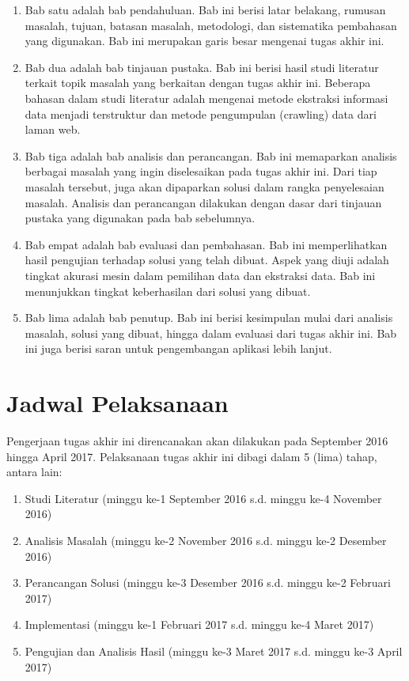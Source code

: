 \begin{enumerate}
    \item Bab satu adalah bab pendahuluan. Bab ini berisi latar belakang, rumusan masalah, tujuan, batasan masalah, metodologi, dan sistematika pembahasan yang digunakan. Bab ini merupakan garis besar mengenai tugas akhir ini.
    \item Bab dua adalah bab tinjauan pustaka. Bab ini berisi hasil studi literatur terkait topik masalah yang berkaitan dengan tugas akhir ini. Beberapa bahasan dalam studi literatur adalah mengenai metode ekstraksi informasi data menjadi terstruktur dan metode pengumpulan (crawling) data dari laman web.
    \item Bab tiga adalah bab analisis dan perancangan. Bab ini memaparkan analisis berbagai masalah yang ingin diselesaikan pada tugas akhir ini. Dari tiap masalah tersebut, juga akan dipaparkan solusi dalam rangka penyelesaian masalah. Analisis dan perancangan dilakukan dengan dasar dari tinjauan pustaka yang digunakan pada bab sebelumnya.
    \item Bab empat adalah bab evaluasi dan pembahasan. Bab ini memperlihatkan hasil pengujian terhadap solusi yang telah dibuat. Aspek yang diuji adalah tingkat akurasi mesin dalam pemilihan data dan ekstraksi data. Bab ini menunjukkan tingkat keberhasilan dari solusi yang dibuat.
    \item Bab lima adalah bab penutup. Bab ini berisi kesimpulan mulai dari analisis masalah, solusi yang dibuat, hingga dalam evaluasi dari tugas akhir ini. Bab ini juga berisi saran untuk pengembangan aplikasi lebih lanjut. 
\end{enumerate}

\section{Jadwal Pelaksanaan}

Pengerjaan tugas akhir ini direncanakan akan dilakukan pada September 2016 hingga April 2017. Pelaksanaan tugas akhir ini dibagi dalam 5 (lima) tahap, antara lain:

\begin{enumerate}
    \item Studi Literatur (minggu ke-1 September 2016 s.d. minggu ke-4 November 2016)
    \item Analisis Masalah (minggu ke-2 November 2016 s.d. minggu ke-2 Desember 2016)
    \item Perancangan Solusi (minggu ke-3 Desember 2016 s.d. minggu ke-2 Februari 2017)
    \item Implementasi (minggu ke-1 Februari 2017 s.d. minggu ke-4 Maret 2017)
    \item Pengujian dan Analisis Hasil (minggu ke-3 Maret 2017 s.d. minggu ke-3 April 2017)
\end{enumerate}

